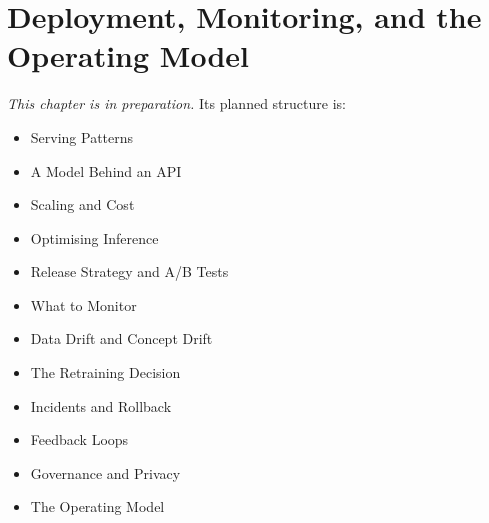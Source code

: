 
\chapter{Deployment, Monitoring, and the Operating Model}
\label{ch:ch22}

\noindent\textit{This chapter is in preparation.} Its planned structure is:

\begin{itemize}
  \item Serving Patterns
  \item A Model Behind an API
  \item Scaling and Cost
  \item Optimising Inference
  \item Release Strategy and A/B Tests
  \item What to Monitor
  \item Data Drift and Concept Drift
  \item The Retraining Decision
  \item Incidents and Rollback
  \item Feedback Loops
  \item Governance and Privacy
  \item The Operating Model
\end{itemize}
